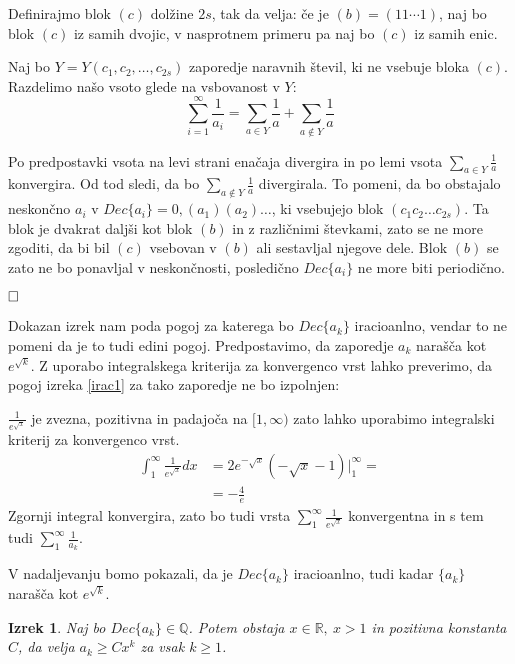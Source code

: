\documentclass[a4paper,12pt]{article}
\def\Q{\mathbb{Q}} %
\def\R{\mathbb{R}} %
\def\qed{$\hfill\Box$}   %
\newtheorem{izrek}{Izrek}
\begin{document}
Definirajmo blok $(c)$ dolžine $2s$, tak da velja: če je $(b) = (11 \cdots 1)$, naj bo blok $(c)$
iz samih dvojic, v nasprotnem primeru pa naj bo $(c)$ iz samih enic.

Naj bo $Y = Y(c_1, c_2, \dots, c_{2s})$ zaporedje naravnih števil, ki ne vsebuje bloka $(c)$.
Razdelimo našo vsoto glede na vsbovanost v $Y$:
\[
    \sum_{i=1}^{\infty} \frac{1}{a_i} = \sum_{a \in Y}\frac{1}{a} + \sum_{a \notin Y} \frac{1}{a}
    \]

Po predpostavki vsota na levi strani enačaja divergira in po lemi vsota $\sum_{a \in Y}\frac{1}{a}$
konvergira. Od tod sledi, da bo $\sum_{a \notin Y} \frac{1}{a}$ divergirala.
To pomeni, da bo obstajalo neskončno $a_i$ v $Dec\{a_i\} = 0,(a_1)(a_2) \dots$, ki vsebujejo blok 
$(c_1c_2\dots c_{2s})$. Ta blok je dvakrat daljši kot blok $(b)$ in z različnimi števkami, zato se ne more
zgoditi, da bi bil $(c)$ vsebovan v $(b)$ ali sestavljal njegove dele. 
Blok $(b)$ se zato ne bo ponavljal v neskončnosti, posledično $Dec\{a_i\}$ ne more biti periodično.

\qed


Dokazan izrek nam poda pogoj za katerega bo $Dec\{a_k\}$ iracioanlno, vendar to ne pomeni da je
to tudi edini pogoj. Predpostavimo, da zaporedje $a_k$ narašča kot $e^{\sqrt{k}}$.
Z uporabo integralskega kriterija za konvergenco vrst lahko preverimo, da pogoj izreka \ref{irac1}
za tako zaporedje ne bo izpolnjen:

$\frac{1}{e^{\sqrt{x}}}$ je zvezna, pozitivna in padajoča na $[1, \infty)$ zato lahko uporabimo
integralski kriterij za konvergenco vrst.
\[
    \begin{split}
    \int_1^{\infty}\frac{1}{e^{\sqrt{x}}}dx &= 2e^{-\sqrt{x}}(- \sqrt{x} - 1) \big|_1^{\infty} = \\
    &= -\frac{4}{e}
    \end{split}
\]
Zgornji integral konvergira, zato bo tudi vrsta $\sum_1^{\infty}\frac{1}{e^{\sqrt{x}}}$ konvergentna in s tem tudi $\sum_1^{\infty}\frac{1}{a_k}$.

V nadaljevanju bomo pokazali, da je $Dec\{a_k\}$ iracioanlno, tudi kadar $\{a_k\}$ narašča kot $e^{\sqrt{k}}$.

\begin{izrek}
    \label{izrek1clanek2}
    Naj bo $Dec\{a_k\} \in \Q$. Potem obstaja $x \in \R, \ x > 1$ in pozitivna konstanta $C$,
    da velja $a_k \geq Cx^k$ za vsak $k \geq 1$.
\end{izrek}
\end{document}
